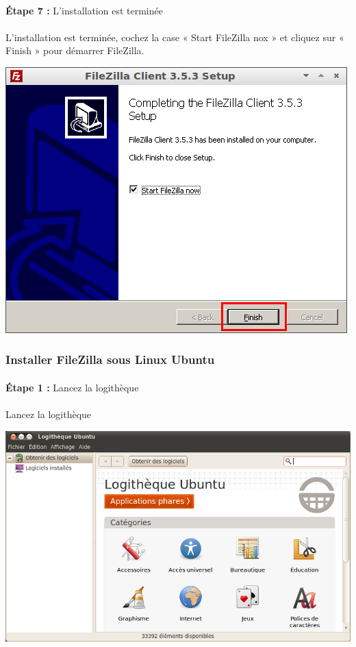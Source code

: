 \documentclass[10pt,a4paper]{article}
\begin{document}
\paragraph{}\textbf{Étape 7 : }L'installation est terminée
\paragraph{}L'installation est terminée, cochez la case « Start FileZilla nox » et cliquez sur « Finish » pour démarrer FileZilla.
\begin{center}
\includegraphics[scale=0.5]{img/0022.png}
\end{center}
\subsubsection{Installer FileZilla sous Linux Ubuntu}
\paragraph{}\textbf{Étape 1 : }Lancez la logithèque
\paragraph{}Lancez la logithèque
\begin{center}
\includegraphics[scale=0.4]{img/0023.png}
\end{center}
\end{document}
